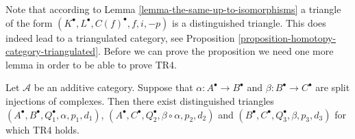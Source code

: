 \noindent
Note that according to Lemma \ref{lemma-the-same-up-to-isomorphisms}
a triangle of the form $(K^\bullet, L^\bullet, C(f)^\bullet, f, i, -p)$
is a distinguished triangle.
This does indeed lead to a triangulated category, see
Proposition \ref{proposition-homotopy-category-triangulated}.
Before we can prove the proposition we need one more lemma
in order to be able to prove TR4.

\begin{lemma}
\label{lemma-two-split-injections}
Let $\mathcal{A}$ be an additive category. Suppose that
$\alpha : A^\bullet \to B^\bullet$ and $\beta : B^\bullet \to C^\bullet$
are split injections of complexes. Then there exist distinguished triangles
$(A^\bullet, B^\bullet, Q_1^\bullet, \alpha, p_1, d_1)$,
$(A^\bullet, C^\bullet, Q_2^\bullet, \beta \circ \alpha, p_2, d_2)$
and
$(B^\bullet, C^\bullet, Q_3^\bullet, \beta, p_3, d_3)$
for which TR4 holds.
\end{lemma}

